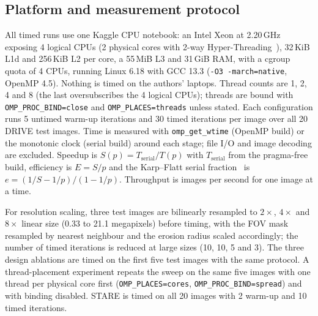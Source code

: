 \subsection{Platform and measurement protocol}\label{sec:protocol}
All timed runs use one Kaggle CPU notebook: an Intel Xeon at 2.20\,GHz exposing 4 logical CPUs (2 physical
cores with 2-way Hyper-Threading~\cite{marr2002}), 32\,KiB L1d and 256\,KiB L2 per core, a 55\,MiB L3
and 31\,GiB RAM, with a cgroup quota of 4 CPUs, running Linux 6.18 with GCC 13.3 (\texttt{-O3 -march=native}, OpenMP 4.5). Nothing is
timed on the authors' laptops. Thread counts are 1, 2, 4 and 8 (the last oversubscribes the 4 logical CPUs);
threads are bound with \texttt{OMP\_PROC\_BIND=close} and \texttt{OMP\_PLACES=threads} unless stated. Each
configuration runs 5 untimed warm-up iterations and 30 timed iterations per image over all 20 DRIVE test images.
Time is measured with \texttt{omp\_get\_wtime} (OpenMP build) or the monotonic clock (serial build) around each
stage; file I/O and image decoding are excluded. Speedup is $S(p)=T_\text{serial}/T(p)$ with
$T_\text{serial}$ from the pragma-free build, efficiency is $E=S/p$ and the Karp--Flatt serial
fraction~\cite{karp1990} is $e=(1/S-1/p)/(1-1/p)$. Throughput is images per second for one image at a time.

For resolution scaling, three test images are bilinearly resampled to $2\times$, $4\times$ and $8\times$ linear
size (0.33 to 21.1 megapixels) before timing, with the FOV mask resampled by nearest neighbour and the erosion
radius scaled accordingly; the number of timed iterations is reduced at large sizes (10, 10, 5 and 3). The
three design ablations are timed on the first five test images with the same protocol. A thread-placement
experiment repeats the sweep on the same five images with one thread per physical core first
(\texttt{OMP\_PLACES=cores}, \texttt{OMP\_PROC\_BIND=spread}) and with binding disabled. STARE is timed on all 20
images with 2 warm-up and 10 timed iterations.
